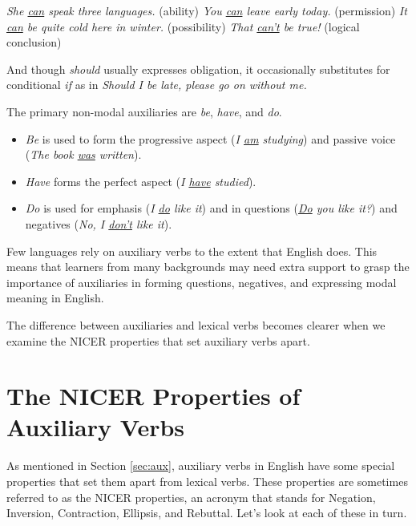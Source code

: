 \ea \label{ex:can-meanings}
\ea \textit{She \uline{can} speak three languages.} \hfill(ability)
\ex \textit{You \uline{can} leave early today.} \hfill(permission)
\ex \textit{It \uline{can} be quite cold here in winter.} \hfill(possibility)
\ex \textit{That \uline{can't} be true!} \hfill(logical conclusion)
\z\z

\noindent And though \textit{should} usually expresses obligation, it occasionally substitutes for conditional \textit{if} as in \textit{Should I be late, please go on without me.}

The primary non-modal auxiliaries are \textit{be}, \textit{have}, and \textit{do}.

\begin{itemize}[nosep]
    \item \textit{Be} is used to form the progressive aspect (\textit{I \uline{am} studying}) and passive voice (\textit{The book \uline{was} written}).
    \item \textit{Have} forms the perfect aspect (\textit{I \uline{have} studied}).
    \item \textit{Do} is used for emphasis (\textit{I \uline{do} like it}) and in questions (\textit{\uline{Do} you like it?}) and negatives (\textit{No, I \uline{don't} like it}).
\end{itemize}

Few languages rely on auxiliary verbs to the extent that English does. This means that learners from many backgrounds may need extra support to grasp the importance of auxiliaries in forming questions, negatives, and expressing modal meaning in English.

The difference between auxiliaries and lexical verbs becomes clearer when we examine the NICER properties that set auxiliary verbs apart.

\section{The NICER Properties of Auxiliary Verbs}\label{sec:NICER}

As mentioned in Section \ref{sec:aux}, auxiliary verbs in English have some special properties that set them apart from lexical verbs. These properties are sometimes referred to as the NICER properties, an acronym that stands for Negation, Inversion, Contraction, Ellipsis, and Rebuttal. Let's look at each of these in turn.


